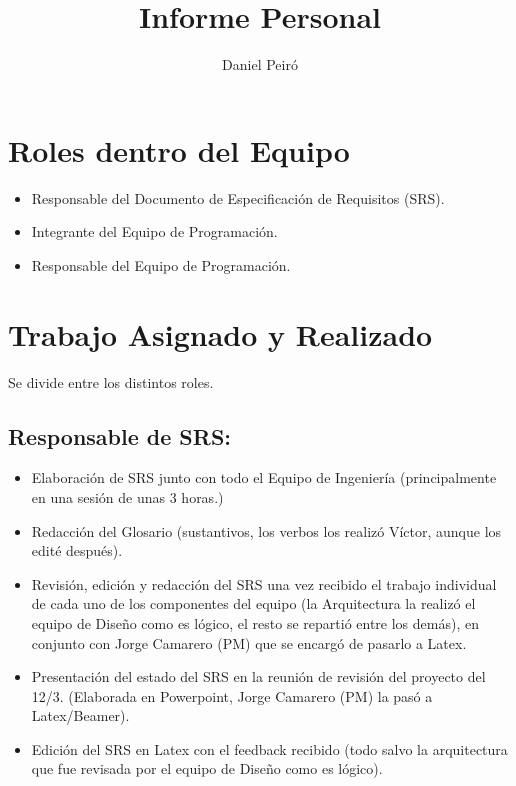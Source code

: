 \documentclass{article}
\author{Daniel Peiró}
\title{Informe Personal}
\begin{document}
\maketitle

\section{Roles dentro del Equipo}
\begin{itemize}
\item Responsable del Documento de Especificación de Requisitos (SRS).
\item Integrante del Equipo de Programación.
\item Responsable del Equipo de Programación.
\end{itemize}


\section{Trabajo Asignado y Realizado}
Se divide entre los distintos roles.
\subsection{Responsable de SRS:}
\begin{itemize}
  \item Elaboración de SRS junto con todo el Equipo de Ingeniería
  (principalmente en una sesión de unas 3 horas.)
  \item Redacción del Glosario (sustantivos, los verbos los realizó Víctor,
  aunque los edité después).
  \item Revisión, edición y redacción del SRS una vez recibido el trabajo
  individual de cada uno de los componentes del equipo (la Arquitectura la realizó el equipo de Diseño
  como es lógico, el resto se repartió entre los demás), en conjunto con Jorge
  Camarero (PM) que se encargó de pasarlo a Latex.
  \item Presentación del estado del SRS en la reunión de revisión del proyecto
  del 12/3. (Elaborada en Powerpoint, Jorge Camarero (PM) la pasó a
  Latex/Beamer).
  \item Edición del SRS en Latex con el feedback recibido (todo salvo la
  arquitectura que fue revisada por el equipo de Diseño como es lógico).
\end{itemize}
\end{document}
